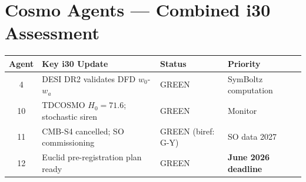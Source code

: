 \documentclass[11pt,a4paper]{article}
\begin{document}
\section{Cosmo Agents --- Combined i30 Assessment}

\begin{center}
\begin{tabular}{clll}
\toprule
\textbf{Agent} & \textbf{Key i30 Update} & \textbf{Status} & \textbf{Priority} \\
\midrule
4 & DESI DR2 validates DFD $w_0$-$w_a$ & GREEN & SymBoltz computation \\
10 & TDCOSMO $H_0 = 71.6$; stochastic siren & GREEN & Monitor \\
11 & CMB-S4 cancelled; SO commissioning & GREEN (biref: G-Y) & SO data 2027 \\
12 & Euclid pre-registration plan ready & GREEN & \textbf{June 2026 deadline} \\
\bottomrule
\end{tabular}
\end{center}
\end{document}
